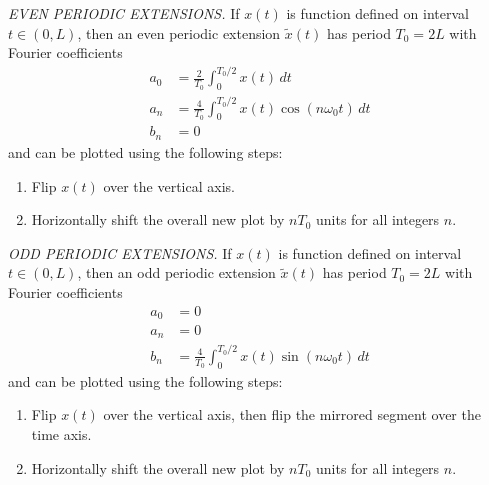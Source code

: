 \documentclass{report}
\begin{document}
\begin{tcolorbox}[width=\textwidth,colback={white}, sharp corners]
    \emph{EVEN PERIODIC EXTENSIONS.}
    If $x(t)$ is function defined on interval $t\in(0,L)$, then an even periodic extension $\tilde{x}(t)$ has period $T_0=2L$ with 
    Fourier coefficients 
    \begin{align}
        a_0 &= \frac{2}{T_0}\int_{0}^{T_0/2} x(t) \,dt \\
        a_n &= \frac{4}{T_0}\int_{0}^{T_0/2} x(t)\cos(n\omega_0 t) \,dt \\
        b_n &= 0
    \end{align}
    and can be plotted using the following steps:
    \begin{enumerate}
        \item Flip $x(t)$ over the vertical axis.
        \item Horizontally shift the overall new plot by $nT_0$ units for all integers $n$.
    \end{enumerate}
\end{tcolorbox}
\begin{tcolorbox}[width=\textwidth,colback={white}, sharp corners]
    \emph{ODD PERIODIC EXTENSIONS.}
    If $x(t)$ is function defined on interval $t\in(0,L)$, then an odd periodic extension $\tilde{x}(t)$ has period $T_0=2L$ with 
    Fourier coefficients 
    \begin{align}
        a_0 &= 0 \\
        a_n &= 0 \\
        b_n &= \frac{4}{T_0}\int_{0}^{T_0/2} x(t)\sin(n\omega_0 t) \,dt
    \end{align}
    and can be plotted using the following steps:
    \begin{enumerate}
        \item Flip $x(t)$ over the vertical axis, then flip the mirrored segment over the time axis.
        \item Horizontally shift the overall new plot by $nT_0$ units for all integers $n$.
    \end{enumerate}
\end{tcolorbox}
\end{document}
